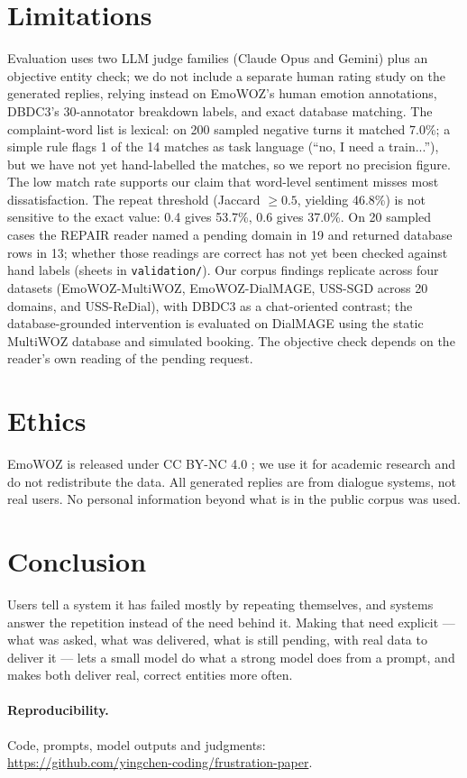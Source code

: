 \documentclass[11pt]{article}
\begin{document}
\section{Limitations}
Evaluation uses two LLM judge families (Claude Opus and Gemini) plus an objective entity check; we do not
include a separate human rating study on the generated replies, relying instead on EmoWOZ's human emotion
annotations, DBDC3's 30-annotator breakdown labels, and exact database matching. The complaint-word list is
lexical: on 200 sampled negative turns it matched 7.0\%; a simple rule flags 1 of the 14 matches as task
language (``no, I need a train...''), but we have not yet hand-labelled the matches, so we report no precision
figure. The low match rate supports our claim that word-level sentiment misses most dissatisfaction. The
repeat threshold (Jaccard $\ge 0.5$, yielding 46.8\%) is not sensitive to the exact value: 0.4 gives 53.7\%,
0.6 gives 37.0\%. On 20 sampled cases the REPAIR reader named a pending domain in 19 and returned database
rows in 13; whether those readings are correct has not yet been checked against hand labels (sheets in
\texttt{validation/}). Our corpus findings replicate across four datasets (EmoWOZ-MultiWOZ, EmoWOZ-DialMAGE,
USS-SGD across 20 domains, and USS-ReDial), with DBDC3 as a chat-oriented contrast; the database-grounded
intervention is evaluated on DialMAGE using the static MultiWOZ database and simulated booking. The objective
check depends on the reader's own reading of the pending request.

\section{Ethics}
EmoWOZ is released under CC BY-NC 4.0 \citep{feng2022emowoz}; we use it for academic research and do not
redistribute the data. All generated replies are from dialogue systems, not real users. No personal
information beyond what is in the public corpus was used.

\section{Conclusion}
Users tell a system it has failed mostly by repeating themselves, and systems answer the repetition instead of
the need behind it. Making that need explicit --- what was asked, what was delivered, what is still pending,
with real data to deliver it --- lets a small model do what a strong model does from a prompt, and makes both
deliver real, correct entities more often.

\paragraph{Reproducibility.} Code, prompts, model outputs and judgments:\\
\url{https://github.com/yingchen-coding/frustration-paper}.



\end{document}
